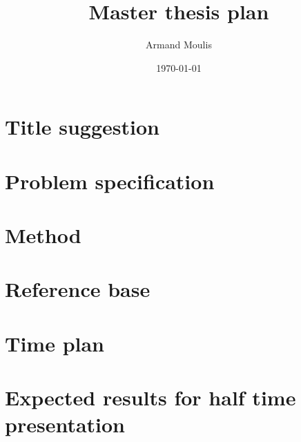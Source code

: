 \documentclass{article}
\begin{document}
	


\title{Master thesis plan}
\author{Armand Moulis}
\date{\today}
\maketitle

\setcounter{tocdepth}{3}
\tableofcontents
\newpage
\setcounter{page}{1}



\section{Title suggestion}
\section{Problem specification}
\section{Method}
\section{Reference base}
\section{Time plan}

\section{Expected results for half time presentation}




\end{document}
